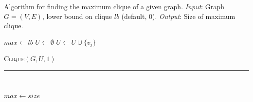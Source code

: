 
\begin{algorithm}[t]
\begin{spacing}{\algospacing}
{
\small
\caption{{\protect\small Algorithm for finding the maximum clique of a given graph.
{\it Input}: Graph $G = \left (V, E\right )$, lower bound on clique $lb$ (default, 0). 
{\it Output}: Size of maximum clique.}}

\label{alg:mClq}
\begin{algorithmic}[1]
\State $max \leftarrow lb$
{}  \label{pr1}
\State $U \leftarrow \emptyset$
  \label{prOld}
  \label{pr2}
\State $U \leftarrow U \cup \{v_j\}$ 
\EndIf
\EndIf
\EndFor

\State \textsc{Clique}$(G, U, 1)$ \label{subCall}
\EndIf

\EndFor
\EndProcedure
\end{algorithmic}
}
\vspace{-4pt}
\rule{1\textwidth}{.1mm}\\
{
\begin{algorithmic}[1]

\State $max \leftarrow size$ \label{critical}
\EndIf
{}
\EndIf


\end{algorithmic}}
\end{spacing}
\end{algorithm}

